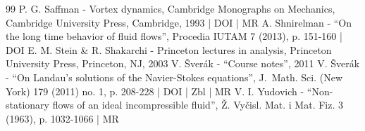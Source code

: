 \begin{thebibliography}{99}
P. G. Saffman - Vortex dynamics, Cambridge Monographs on Mechanics, Cambridge University Press, Cambridge, 1993 | DOI | MR
A. Shnirelman - “On the long time behavior of fluid flows”, Procedia IUTAM 7 (2013), p. 151-160 | DOI
E. M. Stein \& R. Shakarchi - Princeton lectures in analysis, Princeton University Press, Princeton, NJ, 2003
V. Šverák - “Course notes”, 2011
V. Šverák - “On Landau’s solutions of the Navier-Stokes equations”, J. Math. Sci. (New York) 179 (2011) no. 1, p. 208-228 | DOI | Zbl | MR
V. I. Yudovich - “Non-stationary flows of an ideal incompressible fluid”, Ž. Vyčisl. Mat. i Mat. Fiz. 3 (1963), p. 1032-1066 | MR
\end{thebibliography}
